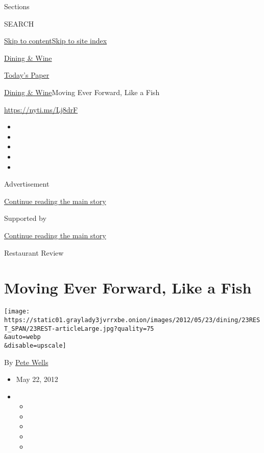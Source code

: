 Sections

SEARCH

\protect\hyperlink{site-content}{Skip to
content}\protect\hyperlink{site-index}{Skip to site index}

\href{https://www.nytimes3xbfgragh.onion/pages/dining/index.html}{Dining
\& Wine}

\href{https://myaccount.nytimes3xbfgragh.onion/auth/login?response_type=cookie\&client_id=vi}{}

\href{https://www.nytimes3xbfgragh.onion/section/todayspaper}{Today's
Paper}

\href{/pages/dining/index.html}{Dining \& Wine}\textbar{}Moving Ever
Forward, Like a Fish

\url{https://nyti.ms/Lj8drF}

\begin{itemize}
\item
\item
\item
\item
\item
\end{itemize}

Advertisement

\protect\hyperlink{after-top}{Continue reading the main story}

Supported by

\protect\hyperlink{after-sponsor}{Continue reading the main story}

Restaurant Review

\hypertarget{moving-ever-forward-like-a-fish}{%
\section{Moving Ever Forward, Like a
Fish}\label{moving-ever-forward-like-a-fish}}

\texttt{[image: https://static01.graylady3jvrrxbe.onion/images/2012/05/23/dining/23REST\_SPAN/23REST-articleLarge.jpg?quality=75\\\&auto=webp\\\&disable=upscale]}

By \href{https://www.nytimes3xbfgragh.onion/by/pete-wells}{Pete Wells}

\begin{itemize}
\item
  May 22, 2012
\item
  \begin{itemize}
  \item
  \item
  \item
  \item
  \item
  \end{itemize}
\end{itemize}

